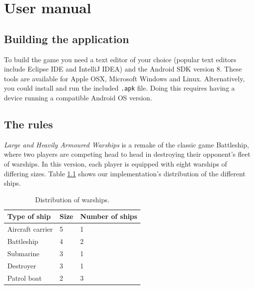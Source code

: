 \chapter{User manual}
\label{cha:users_manual}

\section{Building the application}

To build the game you need a text editor of your choice (popular text editors include Eclipse IDE and IntelliJ IDEA) and the Android SDK version 8. These tools are available for Apple OSX, Microsoft Windows and Linux.
Alternatively, you could install and run the included \texttt{.apk} file. Doing this requires having a device running a compatible Android OS version.


\section{The rules}

\emph{Large and Heavily Armoured Warships} is a remake of the classic game Battleship, where two players are competing head to head in destroying their opponent's fleet of warships. In this version, each player is equipped with eight warships of differing sizes. Table \ref{tab:ship_distribution} shows our implementation's distribution of the different ships.

\vspace{0.5em}
\begin{table}
	\centering
	\label{tab:ship_distribution}
	\begin{tabular}{|l|l|l|}
		\hline
		\rowcolor[gray]{0.8}
		\bf{Type of ship} 	& \bf{Size} & \bf{Number of ships} \\
		\hline
		
		Aircraft carrier	& 5		& 1 \\
		Battleship 			& 4		& 2 \\
		Submarine			& 3		& 1 \\
		Destroyer			& 3		& 1 \\
		Patrol boat			& 2		& 3 \\
		\hline
	\end{tabular}

	\caption{Distribution of warships.}
\end{table}


